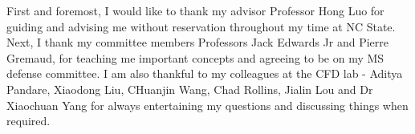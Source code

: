 \begin{acknowledgements}
First and foremost, I would like to thank my advisor Professor Hong Luo for guiding and advising me without reservation throughout my time at NC State. Next, I thank my committee members Professors Jack Edwards Jr and Pierre Gremaud, for teaching me important concepts and agreeing to be on my MS defense committee. I am also thankful to my colleagues at the CFD lab - Aditya Pandare, Xiaodong Liu, CHuanjin Wang, Chad Rollins, Jialin Lou and Dr Xiaochuan Yang for always entertaining my questions and discussing things when required.
\end{acknowledgements}


\thesistableofcontents

\thesislistoftables

\thesislistoffigures
